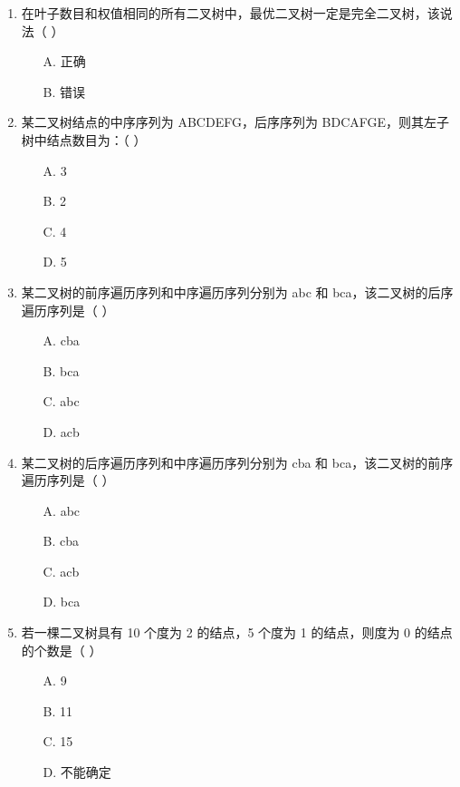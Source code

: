 \documentclass[12pt, a4paper]{article}
\begin{document}
\begin{enumerate}[label=\arabic*.]
	\item 在叶子数目和权值相同的所有二叉树中，最优二叉树一定是完全二叉树，该说法（ ）
	      \begin{enumerate}
		      \item[A.] 正确
		      \item[B.] 错误
	      \end{enumerate}

	\item 某二叉树结点的中序序列为 ABCDEFG，后序序列为 BDCAFGE，则其左子树中结点数目为：（ ）
	      \begin{enumerate}
		      \item[A.] 3
		      \item[B.] 2
		      \item[C.] 4
		      \item[D.] 5
	      \end{enumerate}

	\item 某二叉树的前序遍历序列和中序遍历序列分别为 abc 和 bca，该二叉树的后序遍历序列是（ ）
	      \begin{enumerate}
		      \item[A.] cba
		      \item[B.] bca
		      \item[C.] abc
		      \item[D.] acb
	      \end{enumerate}

	\item 某二叉树的后序遍历序列和中序遍历序列分别为 cba 和 bca，该二叉树的前序遍历序列是（ ）
	      \begin{enumerate}
		      \item[A.] abc
		      \item[B.] cba
		      \item[C.] acb
		      \item[D.] bca
	      \end{enumerate}

	\item 若一棵二叉树具有 10 个度为 2 的结点，5 个度为 1 的结点，则度为 0 的结点的个数是（ ）
	      \begin{enumerate}
		      \item[A.] 9
		      \item[B.] 11
		      \item[C.] 15
		      \item[D.] 不能确定
	      \end{enumerate}


\end{enumerate}
\end{document}
